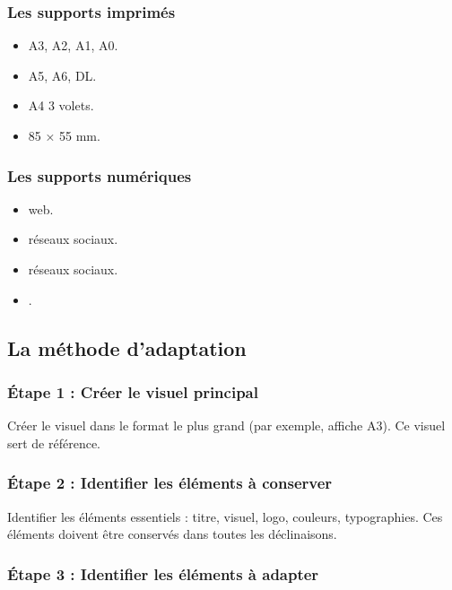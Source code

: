 \subsubsection{Les supports imprimés}

\begin{itemize}
    \item {} A3, A2, A1, A0.
    \item {} A5, A6, DL.
    \item {} A4 3 volets.
    \item {} 85 × 55 mm.
\end{itemize}

\subsubsection{Les supports numériques}

\begin{itemize}
    \item {} web.
    \item {} réseaux sociaux.
    \item {} réseaux sociaux.
    \item {}.
\end{itemize}

\subsection{La méthode d'adaptation}

\subsubsection{Étape 1 : Créer le visuel principal}

Créer le visuel dans le format le plus grand (par exemple, affiche A3). Ce visuel sert de référence.

\subsubsection{Étape 2 : Identifier les éléments à conserver}

Identifier les éléments essentiels : titre, visuel, logo, couleurs, typographies. Ces éléments doivent être conservés dans toutes les déclinaisons.

\subsubsection{Étape 3 : Identifier les éléments à adapter}

